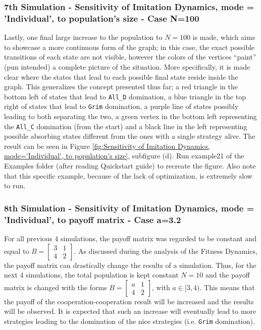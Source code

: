 \subsubsection{7th Simulation - Sensitivity of Imitation Dynamics, mode = 'Individual', to population's size - Case N=100}
Lastly, one final large increase to the population to $N=100$ is made, which aims to showcase a more continuous form of the graph; in this case, the exact possible transitions of each state are not visible, however the colors of the vertices ``paint'' (pun intended) a complete picture of the situation. More specifically, it is made clear where the states that lead to each possible final state reside inside the graph. This generalizes the concept presented thus far; a red triangle in the bottom left of states that lead to \texttt{All\_D} domination, a blue triangle in the top right of states that lead to \texttt{Grim} domination, a purple line of states possibly leading to both separating the two, a green vertex in the bottom left representing the \texttt{All\_C} domination (from the start) and a black line in the left representing possible absorbing states different from the ones with a single strategy alive. The result can be seen in Figure \ref{fig:Sensitivity of Imitation Dynamics, mode='Individual', to population's size}, subfigure (d). Run example21 of the Examples folder (after reading Quickstart guide) to recreate the figure. Also note that this specific example, because of the lack of optimization, is extremely slow to run.

\subsubsection{8th Simulation - Sensitivity of Imitation Dynamics, mode = 'Individual', to payoff matrix - Case a=3.2}
For all previous 4 simulations, the payoff matrix was regarded to be constant and equal to $B = \begin{bmatrix} 3 & 1 \\ 4 & 2 \end{bmatrix}$. As discussed during the analysis of the Fitness Dynamics, the payoff matrix can drastically change the results of a simulation. Thus, for the next 4 simulations, the total population is kept constant $N=10$ and the payoff matrix is changed with the forms $B = \begin{bmatrix} a & 1 \\ 4 & 2 \end{bmatrix}$, with $a \in [3,4)$. This means that the payoff of the cooperation-cooperation result will be increased and the results will be observed. It is expected that such an increase will eventually lead to more strategies leading to the domination of the nice strategies (i.e. \texttt{Grim} domination). 

